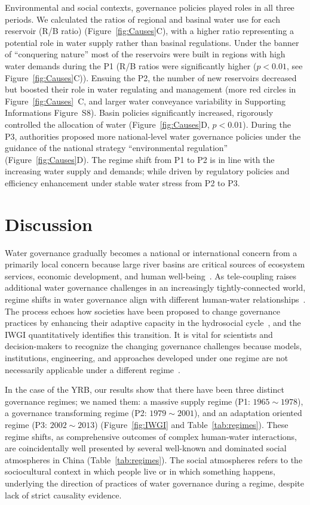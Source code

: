 \documentclass[draft]{../agujournal2019}
\begin{document}
Environmental and social contexts, governance policies played roles in all three periods.
We calculated the ratios of regional and basinal water use for each reservoir (R/B ratio) (Figure~\ref{fig:Causes}C), with a higher ratio representing a potential role in water supply rather than basinal regulations.
Under the banner of ``conquering nature'' most of the reservoirs were built in regions with high water demands during the P1 (R/B ratios were significantly higher ($p<0.01$, see Figure~\ref{fig:Causes}C)).
Ensuing the P2, the number of new reservoirs decreased but boosted their role in water regulating and management (more red circles in Figure~\ref{fig:Causes}~C, and larger water conveyance variability in Supporting Informations Figure~S8).
Basin policies significantly increased, rigorously controlled the allocation of water (Figure~\ref{fig:Causes}D, $p<0.01$).
During the P3, authorities proposed more national-level water governance policies under the guidance of the national strategy ``environmental regulation'' (Figure~\ref{fig:Causes}D).
The regime shift from P1 to P2 is in line with the increasing water supply and demands; while driven by regulatory policies and efficiency enhancement under stable water stress from P2 to P3.


\section{Discussion}\label{sec12}

Water governance gradually becomes a national or international concern from a primarily local concern because large river basins are critical sources of ecosystem services, economic development, and human well-being~\cite{best2019,best2020}.
As tele-coupling raises additional water governance challenges in an increasingly tightly-connected world, regime shifts in water governance align with different human-water relationships~\cite{diaz2019}.
The process echoes how societies have been proposed to change governance practices by enhancing their adaptive capacity in the hydrosocial cycle~\cite{loch2020,turton1999}, and the IWGI quantitatively identifies this transition.
It is vital for scientists and decision-makers to recognize the changing governance challenges because models, institutions, engineering, and approaches developed under one regime are not necessarily applicable under a different regime~\cite{reyers2018}.

In the case of the YRB, our results show that there have been three distinct governance regimes; we named them: a massive supply regime (P1: $1965 \sim 1978$), a governance transforming regime (P2: $1979 \sim 2001$), and an adaptation oriented regime (P3: $2002 \sim 2013$) (Figure~\ref{fig:IWGI} and Table~\ref{tab:regimes}).
These regime shifts, as comprehensive outcomes of complex human-water interactions, are coincidentally well presented by several well-known and dominated social atmospheres in China (Table~\ref{tab:regimes}).
The social atmospheres refers to the sociocultural context in which people live or in which something happens, underlying the direction of practices of water governance during a regime, despite lack of strict causality evidence.
\end{document}
